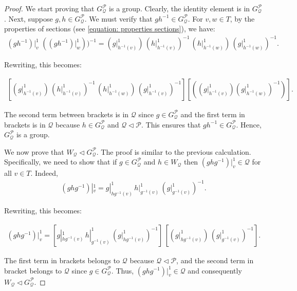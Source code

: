 \documentclass[10pt,a4paper]{amsart}
\begin{document}
\begin{proof}
We start proving that $G_\mathcal{Q}^\mathcal{P}$ is a group. Clearly, the identity element is in $G_\mathcal{Q}^\mathcal{P}$. Next, suppose $g,h \in G_\mathcal{Q}^\mathcal{P}$. We must verify that $gh^{-1} \in G_\mathcal{Q}^\mathcal{P}$. For $v,w \in T$, by the properties of sections (see \cref{equation: properties sections}), we have:
\begin{align*}
(gh^{-1})|_v^1 \, \, ((gh^{-1})|_w^1))^{-1} = (g|_{h^{-1}(v)}^1) \, (h|_{h^{-1}(v)}^1)^{-1} \, (h|_{h^{-1}(w)}^1) \,  (g|_{h^{-1}(w)}^1)^{-1}.
\end{align*}

Rewriting, this becomes:

\begin{align*}
\left[ (g|_{h^{-1}(v)}^1) \, (h|_{h^{-1}(v)}^1)^{-1} \, (h|_{h^{-1}(w)}^1) \, (g|_{h^{-1}(v)}^1)^{-1} \right]  \left[ ((g|_{h^{-1}(v)}^1)  (g|_{h^{-1}(w)}^1)^{-1}) \right].
\end{align*}

The second term between brackets is in $\mathcal{Q}$ since $g \in G_\mathcal{Q}^\mathcal{P}$ and the first term in brackets is in $\mathcal{Q}$ because $h \in G_\mathcal{Q}^\mathcal{P}$ and $\mathcal{Q} \lhd \mathcal{P}$. This ensures that $gh^{-1} \in G_\mathcal{Q}^\mathcal{P}$. Hence, $G_\mathcal{Q}^\mathcal{P}$ is a group.

We now prove that $W_\mathcal{Q} \lhd G_\mathcal{Q}^\mathcal{P}$. The proof is similar to the previous calculation. Specifically, we need to show that if $g \in G_\mathcal{Q}^\mathcal{P}$ and $h \in W_\mathcal{Q}$ then $(ghg^{-1})|_v^1 \in \mathcal{Q}$ for all $v \in T$. Indeed,
\begin{align*}
(ghg^{-1})|_v^1 = g|_{hg^{-1}(v)}^1 \, h|_{g^{-1}(v)}^1 \, (g|_{g^{-1}(v)}^1)^{-1}.
\end{align*}

Rewriting, this becomes:

\begin{align*}
 (ghg^{-1})|_v^1 = \left[ g|_{hg^{-1}(v)}^1 \, h|_{g^{-1}(v)}^1 \, (g|_{hg^{-1}(v)}^1)^{-1} \right] \, \left[ (g|_{hg^{-1}(v)}^1) \, (g|_{g^{-1}(v)}^1)^{-1} \right].  
\end{align*}

The first term in brackets belongs to $\mathcal{Q}$ because $\mathcal{Q} \lhd \mathcal{P}$, and the second term in bracket belongs to $\mathcal{Q}$ since $g \in G_\mathcal{Q}^\mathcal{P}$. Thus, $(ghg^{-1})|_v^1 \in \mathcal{Q}$ and consequently $W_\mathcal{Q} \lhd G_\mathcal{Q}^\mathcal{P}$.


\end{proof}
\end{document}

